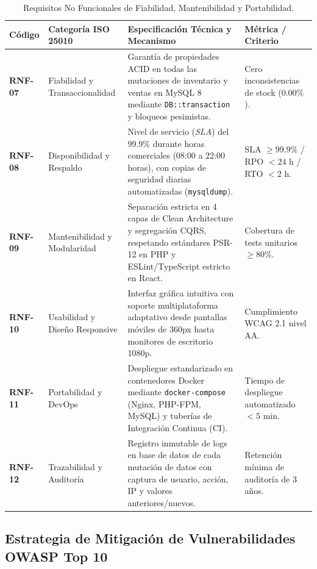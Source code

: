 \begin{table}[H]
\centering
\small
\begin{tabularx}{\linewidth}{l>{\raggedright\arraybackslash}p{3.2cm}>{\raggedright\arraybackslash}X>{\raggedright\arraybackslash}p{2.8cm}}
\toprule
\rowcolor{LightSlate}
\textbf{Código} & \textbf{Categoría ISO 25010} & \textbf{Especificación Técnica y Mecanismo} & \textbf{Métrica / Criterio} \\
\midrule
\textbf{RNF-07} & Fiabilidad y Transaccionalidad & Garantía de propiedades ACID en todas las mutaciones de inventario y ventas en MySQL 8 mediante \texttt{DB::transaction} y bloqueos pesimistas. & Cero inconsistencias de stock ($0.00\%$). \\
\midrule
\textbf{RNF-08} & Disponibilidad y Respaldo & Nivel de servicio (\textit{SLA}) del 99.9\% durante horas comerciales (08:00 a 22:00 horas), con copias de seguridad diarias automatizadas (\texttt{mysqldump}). & SLA $\ge 99.9\%$ / RPO $< 24$ h / RTO $< 2$ h. \\
\midrule
\textbf{RNF-09} & Mantenibilidad y Modularidad & Separación estricta en 4 capas de Clean Architecture y segregación CQRS, respetando estándares PSR-12 en PHP y ESLint/TypeScript estricto en React. & Cobertura de tests unitarios $\ge 80\%$. \\
\midrule
\textbf{RNF-10} & Usabilidad y Diseño Responsive & Interfaz gráfica intuitiva con soporte multiplataforma adaptativo desde pantallas móviles de 360px hasta monitores de escritorio 1080p. & Cumplimiento WCAG 2.1 nivel AA. \\
\midrule
\textbf{RNF-11} & Portabilidad y DevOps & Despliegue estandarizado en contenedores Docker mediante \texttt{docker-compose} (Nginx, PHP-FPM, MySQL) y tuberías de Integración Continua (CI). & Tiempo de despliegue automatizado $< 5$ min. \\
\midrule
\textbf{RNF-12} & Trazabilidad y Auditoría & Registro inmutable de logs en base de datos de cada mutación de datos con captura de usuario, acción, IP y valores anteriores/nuevos. & Retención mínima de auditoría de 3 años. \\
\bottomrule
\end{tabularx}
\caption{Requisitos No Funcionales de Fiabilidad, Mantenibilidad y Portabilidad.}
\label{tab:rnf_parte2}
\end{table}

\subsection{Estrategia de Mitigación de Vulnerabilidades OWASP Top 10}


